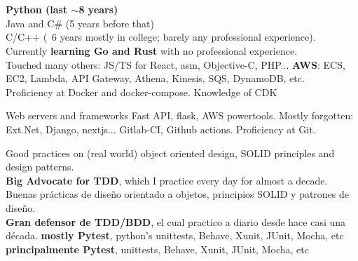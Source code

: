 \section{}


\cvcomputer
    {}
        {\textbf{Python (last $\sim$8 years)}
        \\ Java and C\# (5 years before that)
        \\ C/C++ (~6 years mostly in college; barely any professional experience).
        \\ Currently \textbf{learning Go and Rust} with no professional experience.
        \\ Touched many others: JS/TS for React, asm, Objective-C, PHP...}
    {}
        {\textbf{AWS}: ECS, EC2, Lambda, API Gateway, Athena, Kinesis, SQS, DynamoDB, etc. \\
        Proficiency at Docker and docker-compose. Knowledge of CDK}


\cvcomputer
    {Web servers and frameworks}
        {Fast API, flask, AWS powertools. Mostly forgotten: Ext.Net, Django, nextjs...}
    {}
        {Gitlab-CI, Github actions. Proficiency at Git.}


\cvcomputer
    {}
        {\ml
            {Good practices on (real world) object oriented design, SOLID
            principles and design patterns. \\ \textbf{Big Advocate for TDD},
            which I practice every day for almost a decade.}
            {Buenas prácticas de diseño orientado a objetos, principios SOLID y
            patrones de diseño. \\ \textbf{Gran defensor de TDD/BDD}, el cual
            practico a diario desde hace casi una década.}
        }
    {}
        {\ml
            {\textbf{mostly Pytest}, python's unittests, Behave, Xunit, JUnit, Mocha, etc}
            {\textbf{principalmente Pytest}, unittests, Behave, Xunit, JUnit, Mocha, etc}
        }



